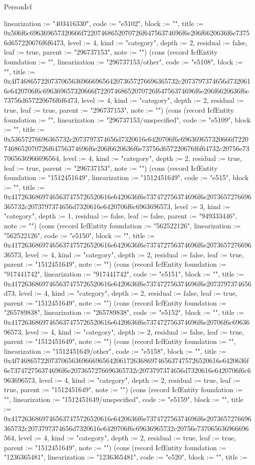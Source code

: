 \begin{lexlean}{PersonIcf}
\begin{semanticmodule}
{linearization := "403416330", code := "e5102", block := "", title := 0x506f6c696369657320666f72207468652070726f64756374696f6e206f6620636f6e73756d657220676f6f6473, level := 4, kind := "category", depth := 2, residual := false, leaf := true, parent := "296737153", note := ""}) (cons (record IcfEntity {foundation := "", linearization := "296737153/other", code := "e5108", block := "", title := 0x4f74686572207370656369666965642073657276696365732c2073797374656d7320616e6420706f6c696369657320666f72207468652070726f64756374696f6e206f6620636f6e73756d657220676f6f6473, level := 4, kind := "category", depth := 2, residual := true, leaf := true, parent := "296737153", note := ""}) (cons (record IcfEntity {foundation := "", linearization := "296737153/unspecified", code := "e5109", block := "", title := 0x53657276696365732c2073797374656d7320616e6420706f6c696369657320666f72207468652070726f64756374696f6e206f6620636f6e73756d657220676f6f64732c20756e737065636966696564, level := 4, kind := "category", depth := 2, residual := true, leaf := true, parent := "296737153", note := ""}) (cons (record IcfEntity {foundation := "1512451649", linearization := "1512451649", code := "e515", block := "", title := 0x41726368697465637475726520616e6420636f6e737472756374696f6e2073657276696365732c2073797374656d7320616e6420706f6c6963696573, level := 3, kind := "category", depth := 1, residual := false, leaf := false, parent := "949333446", note := ""}) (cons (record IcfEntity {foundation := "562522126", linearization := "562522126", code := "e5150", block := "", title := 0x41726368697465637475726520616e6420636f6e737472756374696f6e207365727669636573, level := 4, kind := "category", depth := 2, residual := false, leaf := true, parent := "1512451649", note := ""}) (cons (record IcfEntity {foundation := "917441742", linearization := "917441742", code := "e5151", block := "", title := 0x41726368697465637475726520616e6420636f6e737472756374696f6e2073797374656d73, level := 4, kind := "category", depth := 2, residual := false, leaf := true, parent := "1512451649", note := ""}) (cons (record IcfEntity {foundation := "265789838", linearization := "265789838", code := "e5152", block := "", title := 0x41726368697465637475726520616e6420636f6e737472756374696f6e20706f6c6963696573, level := 4, kind := "category", depth := 2, residual := false, leaf := true, parent := "1512451649", note := ""}) (cons (record IcfEntity {foundation := "", linearization := "1512451649/other", code := "e5158", block := "", title := 0x4f74686572207370656369666965642061726368697465637475726520616e6420636f6e737472756374696f6e2073657276696365732c2073797374656d7320616e6420706f6c6963696573, level := 4, kind := "category", depth := 2, residual := true, leaf := true, parent := "1512451649", note := ""}) (cons (record IcfEntity {foundation := "", linearization := "1512451649/unspecified", code := "e5159", block := "", title := 0x41726368697465637475726520616e6420636f6e737472756374696f6e2073657276696365732c2073797374656d7320616e6420706f6c69636965732c20756e737065636966696564, level := 4, kind := "category", depth := 2, residual := true, leaf := true, parent := "1512451649", note := ""}) (cons (record IcfEntity {foundation := "1236365481", linearization := "1236365481", code := "e520", block := "", title := }
\end{semanticmodule}
\end{lexlean}
